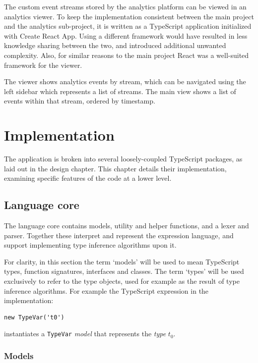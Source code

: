 \documentclass[a4paper,fleqn,oneside,12pt]{report}
\begin{document}
The custom event streams stored by the analytics platform can be viewed in an analytics viewer. To keep the implementation consistent between the main project and the analytics sub-project, it is written as a TypeScript application initialized with Create React App. Using a different framework would have resulted in less knowledge sharing between the two, and introduced additional unwanted complexity. Also, for similar reasons to the main project React was a well-suited framework for the viewer.

The viewer shows analytics events by stream, which can be navigated using the left sidebar which represents a list of streams. The main view shows a list of events within that stream, ordered by timestamp.

\chapter{Implementation}\label{id:h.igepudpadp49}

The application is broken into several loosely-coupled TypeScript packages, as laid out in the design chapter. This chapter details their implementation, examining specific features of the code at a lower level.

\section{Language core}\label{id:h.o3ngfa303saw}

The language core contains models, utility and helper functions, and a lexer and parser. Together these interpret and represent the expression language, and support implementing type inference algorithms upon it.

For clarity, in this section the term `models' will be used to mean TypeScript types, function signatures, interfaces and classes. The term `types' will be used exclusively to refer to the type objects, used for example as the result of type inference algorithms. For example the TypeScript expression in the implementation:

\begin{verbatim}
new TypeVar('t0')
\end{verbatim}
instantiates a \texttt{TypeVar} \textit{model} that represents the \textit{type} $t_0$.

\subsection{Models}\label{id:h.f0aymht9bwx3}
\end{document}
